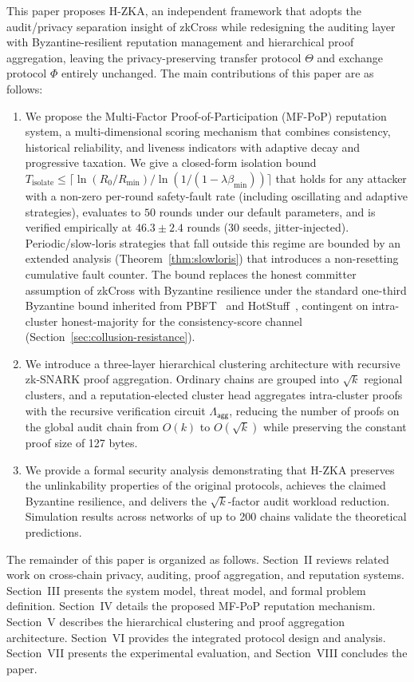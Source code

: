 \documentclass[journal]{IEEEtran}
\newcommand{\aggCircuit}{\Lambda_{\mathsf{agg}}}
\begin{document}
This paper proposes H-ZKA, an independent framework that adopts the audit/privacy separation insight of zkCross while redesigning the auditing layer with Byzantine-resilient reputation management and hierarchical proof aggregation, leaving the privacy-preserving transfer protocol $\Theta$ and exchange protocol $\Phi$ entirely unchanged. The main contributions of this paper are as follows:
\begin{enumerate}
    \item We propose the Multi-Factor Proof-of-Participation (MF-PoP) reputation system, a multi-dimensional scoring mechanism that combines consistency, historical reliability, and liveness indicators with adaptive decay and progressive taxation. We give a closed-form isolation bound $T_{\mathrm{isolate}} \le \lceil \ln(R_0/R_{\min})/\ln(1/(1-\lambda\beta_{\min})) \rceil$ that holds for any attacker with a non-zero per-round safety-fault rate (including oscillating and adaptive strategies), evaluates to $50$ rounds under our default parameters, and is verified empirically at $46.3 \pm 2.4$ rounds (30 seeds, jitter-injected). Periodic/slow-loris strategies that fall outside this regime are bounded by an extended analysis (Theorem~\ref{thm:slowloris}) that introduces a non-resetting cumulative fault counter. The bound replaces the honest committer assumption of zkCross with Byzantine resilience under the standard one-third Byzantine bound inherited from PBFT~\cite{castro1999pbft} and HotStuff~\cite{yin2019hotstuff}, contingent on intra-cluster honest-majority for the consistency-score channel (Section~\ref{sec:collusion-resistance}).
    \item We introduce a three-layer hierarchical clustering architecture with recursive zk-SNARK proof aggregation. Ordinary chains are grouped into $\sqrt{k}$ regional clusters, and a reputation-elected cluster head aggregates intra-cluster proofs with the recursive verification circuit $\aggCircuit$, reducing the number of proofs on the global audit chain from $O(k)$ to $O(\sqrt{k})$ while preserving the constant proof size of 127 bytes.
    \item We provide a formal security analysis demonstrating that H-ZKA preserves the unlinkability properties of the original protocols, achieves the claimed Byzantine resilience, and delivers the $\sqrt{k}$-factor audit workload reduction. Simulation results across networks of up to 200 chains validate the theoretical predictions.
\end{enumerate}

The remainder of this paper is organized as follows. Section~II reviews related work on cross-chain privacy, auditing, proof aggregation, and reputation systems. Section~III presents the system model, threat model, and formal problem definition. Section~IV details the proposed MF-PoP reputation mechanism. Section~V describes the hierarchical clustering and proof aggregation architecture. Section~VI provides the integrated protocol design and analysis. Section~VII presents the experimental evaluation, and Section~VIII concludes the paper.
\end{document}
